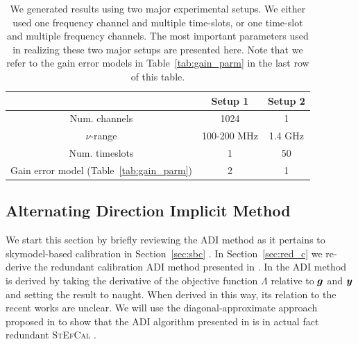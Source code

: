 \documentclass[useAMS,usenatbib]{mn2e}
\newcommand{\bg}{\bmath{g}}
\newcommand{\by}{\bmath{y}}
\begin{document}
\begin{table}
\centering
\caption{We generated results using two major experimental setups. We either used one frequency channel and multiple time-slots, or one time-slot and multiple frequency 
channels. The most important parameters used in realizing these two major setups are presented here. Note that we refer to the gain error models in Table~\ref{tab:gain_parm} in the 
last row of this table.}
\begin{tabular}{|c c c|} 
\hline
 & Setup 1 & Setup 2\\
\hline
\hline
 Num. channels & 1024 & 1\\
$\nu$-range & 100-200 MHz & 1.4 GHz\\
Num. timeslots & 1 & 50\\
Gain error model (Table~\ref{tab:gain_parm}) & 2 & 1\\
\hline
\end{tabular}
\label{tab:ch_parm}
\end{table}

\subsection{Alternating Direction Implicit Method}
\label{sec:adi}

We start this section by briefly reviewing the ADI method as it pertains to skymodel-based calibration in Section~\ref{sec:sbc} \citep{Salvini2014,Smirnov2015}.
In Section~\ref{sec:red_c} we re-derive the redundant calibration ADI method presented in \citet{Marthi2014}. In \citet{Marthi2014} the ADI method is derived by taking the derivative of the 
objective function $\Lambda$ relative to $\bg$ and $\by$ and setting the result to naught. When derived in this way, its relation to the recent works \citep{Salvini2014,Smirnov2015} are unclear.
We will use the diagonal-approximate approach proposed in \citet{Smirnov2015} to show that the ADI algorithm presented in \citet{Marthi2014} is in actual fact redundant 
\textsc{StEfCal} \citep{Salvini2014}. 
\end{document}
